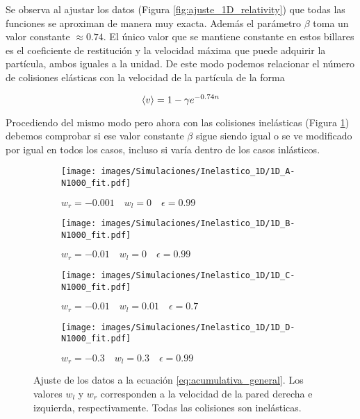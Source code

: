 \documentclass[11pt, spanish]{book}
\begin{document}
\vspace{3mm}

Se observa al ajustar los datos (Figura \ref{fig:ajuste_1D_relativity}) que todas las funciones se aproximan de manera muy exacta. Además el parámetro \( \beta \) toma un valor constante \( \approx 0.74 \). El único valor que se mantiene constante en estos billares es el coeficiente de restitución y la velocidad máxima que puede adquirir la partícula, ambos iguales a la unidad. De este modo podemos relacionar el número de colisiones elásticas con la velocidad de la partícula de la forma

\begin{equation}
    \expval{v} = 1 - \gamma e^{-0.74n}
\end{equation}

Procediendo del mismo modo pero ahora con las colisiones inelásticas (Figura \ref{fig:ajuste_1D_inelastic}) debemos comprobar si ese valor constante \( \beta \) sigue siendo igual o se ve modificado por igual en todos los casos, incluso si varía dentro de los casos inlásticos. 

\begin{figure}[H]
    \begin{subfigure}[b]{0.5\textwidth}
        \centering
        \texttt{[image: images/Simulaciones/Inelastico\_1D/1D\_A-N1000\_fit.pdf]}
        \caption{$w_r = -0.001 \quad w_l = 0 \quad \epsilon = 0.99$}
    \end{subfigure}
    \hfill
    \begin{subfigure}[b]{0.5\textwidth}
        \centering
        \texttt{[image: images/Simulaciones/Inelastico\_1D/1D\_B-N1000\_fit.pdf]}
        \caption{$w_r = -0.01 \quad w_l = 0 \quad \epsilon = 0.99$}
    \end{subfigure}
    \hfill
    \begin{subfigure}[b]{0.5\textwidth}
        \centering
        \texttt{[image: images/Simulaciones/Inelastico\_1D/1D\_C-N1000\_fit.pdf]}
        \caption{$w_r = -0.01 \quad w_l = 0.01 \quad \epsilon = 0.7$}
    \end{subfigure}
    \hfill
    \begin{subfigure}[b]{0.5\textwidth}
        \centering
        \texttt{[image: images/Simulaciones/Inelastico\_1D/1D\_D-N1000\_fit.pdf]}
        \caption{$w_r = -0.3 \quad w_l = 0.3 \quad \epsilon = 0.99$}
    \end{subfigure}
    \caption{Ajuste de los datos a la ecuación \ref{eq:acumulativa_general}. Los valores \( w_l \) y \( w_r \) corresponden a la velocidad de la pared derecha e izquierda, respectivamente. Todas las colisiones son  inelásticas.}
    \label{fig:ajuste_1D_inelastic}
\end{figure}
\end{document}

